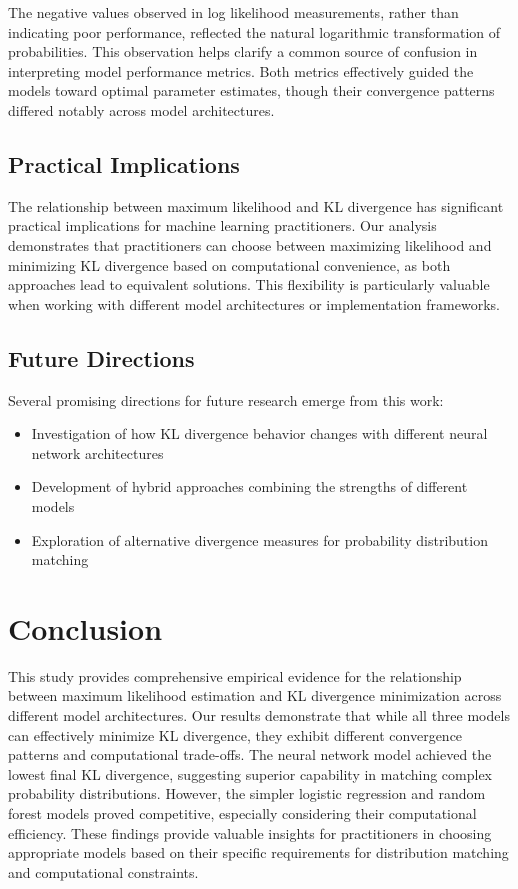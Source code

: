 \documentclass[preprint,12pt]{elsarticle}
\begin{document}
The negative values observed in log likelihood measurements, rather than indicating poor performance, reflected the natural logarithmic transformation of probabilities. This observation helps clarify a common source of confusion in interpreting model performance metrics. Both metrics effectively guided the models toward optimal parameter estimates, though their convergence patterns differed notably across model architectures.

\subsection{Practical Implications}
The relationship between maximum likelihood and KL divergence has significant practical implications for machine learning practitioners. Our analysis demonstrates that practitioners can choose between maximizing likelihood and minimizing KL divergence based on computational convenience, as both approaches lead to equivalent solutions. This flexibility is particularly valuable when working with different model architectures or implementation frameworks.

\subsection{Future Directions}
Several promising directions for future research emerge from this work:

\begin{itemize}
    \item Investigation of how KL divergence behavior changes with different neural network architectures
    \item Development of hybrid approaches combining the strengths of different models
    \item Exploration of alternative divergence measures for probability distribution matching
\end{itemize}

\section{Conclusion}
This study provides comprehensive empirical evidence for the relationship between maximum likelihood estimation and KL divergence minimization across different model architectures. Our results demonstrate that while all three models can effectively minimize KL divergence, they exhibit different convergence patterns and computational trade-offs. The neural network model achieved the lowest final KL divergence, suggesting superior capability in matching complex probability distributions. However, the simpler logistic regression and random forest models proved competitive, especially considering their computational efficiency. These findings provide valuable insights for practitioners in choosing appropriate models based on their specific requirements for distribution matching and computational constraints.
\end{document}
